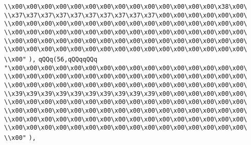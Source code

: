 \verb|\\x00\x00\x00\x00\x00\x00\x00\x00\x00\x00\x00\x00\x00\x00\x38\x00\|\newline
\verb|\\x37\x37\x37\x37\x37\x37\x37\x37\x37\x37\x00\x00\x00\x00\x00\x00\|\newline
\verb|\\x00\x00\x00\x00\x00\x00\x00\x00\x00\x00\x00\x00\x00\x00\x00\x00\|\newline
\verb|\\x00\x00\x00\x00\x00\x00\x00\x00\x00\x00\x00\x00\x00\x00\x00\x00\|\newline
\verb|\\x00\x00\x00\x00\x00\x00\x00\x00\x00\x00\x00\x00\x00\x00\x00\x00\|\newline
\verb|\\x00\x00\x00\x00\x00\x00\x00\x00\x00\x00\x00\x00\x00\x00\x00\x00\|\newline
\verb|\\x00"|\newline
\verb|),|\newline
\verb|qQQq(56,qQQqqQQq|\newline
\verb|"\x00\x00\x00\x00\x00\x00\x00\x00\x00\x00\x00\x00\x00\x00\x00\x00\|\newline
\verb|\\x00\x00\x00\x00\x00\x00\x00\x00\x00\x00\x00\x00\x00\x00\x00\x00\|\newline
\verb|\\x00\x00\x00\x00\x00\x00\x00\x00\x00\x00\x00\x00\x00\x00\x00\x00\|\newline
\verb|\\x39\x39\x39\x39\x39\x39\x39\x39\x39\x39\x00\x00\x00\x00\x00\x00\|\newline
\verb|\\x00\x00\x00\x00\x00\x00\x00\x00\x00\x00\x00\x00\x00\x00\x00\x00\|\newline
\verb|\\x00\x00\x00\x00\x00\x00\x00\x00\x00\x00\x00\x00\x00\x00\x00\x00\|\newline
\verb|\\x00\x00\x00\x00\x00\x00\x00\x00\x00\x00\x00\x00\x00\x00\x00\x00\|\newline
\verb|\\x00\x00\x00\x00\x00\x00\x00\x00\x00\x00\x00\x00\x00\x00\x00\x00\|\newline
\verb|\\x00"|\newline
\verb|),|\newline
